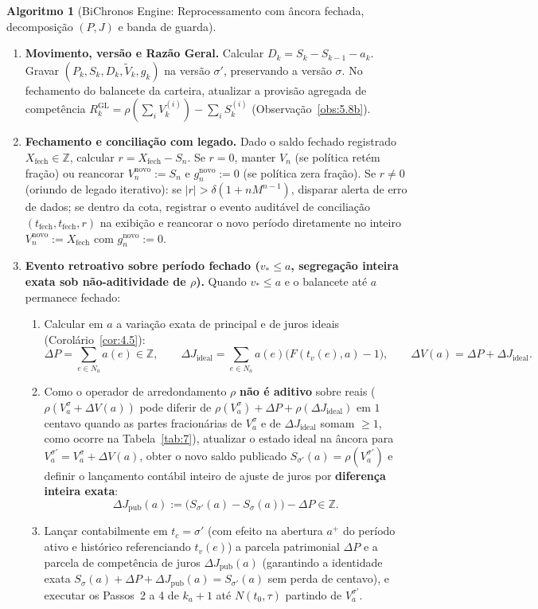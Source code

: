 \documentclass[11pt, a4paper]{article}
\theoremstyle{definition}
\newtheorem{algoritmo}[definicao]{Algoritmo}
\theoremstyle{plain}
\theoremstyle{remark}
\begin{document}
\begin{algoritmo}[BiChronos Engine: Reprocessamento com âncora fechada, decomposição $(P, J)$ e banda de guarda]
\begin{enumerate}[label=\textbf{\arabic*.}]
    \item \textbf{Movimento, versão e Razão Geral.} Calcular $D_k = S_k - S_{k-1} - a_k$. Gravar $(P_k, S_k, D_k, \tilde{V}_k, g_k)$ na versão $\sigma'$, preservando a versão $\sigma$. No fechamento do balancete da carteira, atualizar a provisão agregada de competência $R_k^{\text{GL}} = \rho(\sum_i V_k^{(i)}) - \sum_i S_k^{(i)}$ (Observação~\ref{obs:5.8b}).
    \item \textbf{Fechamento e conciliação com legado.} Dado o saldo fechado registrado $X_{\text{fech}} \in \mathbb{Z}$, calcular $r = X_{\text{fech}} - S_n$. Se $r = 0$, manter $V_n$ (se política retém fração) ou reancorar $V_n^{\text{novo}} := S_n$ e $g_n^{\text{novo}} := 0$ (se política zera fração). Se $r \neq 0$ (oriundo de legado iterativo): se $|r| > \delta(1 + n M^{n-1})$, disparar alerta de erro de dados; se dentro da cota, registrar o evento auditável de conciliação $(t_{\text{fech}}, t_{\text{fech}}, r)$ na exibição e reancorar o novo período diretamente no inteiro $V_n^{\text{novo}} := X_{\text{fech}}$ com $g_n^{\text{novo}} := 0$.
    \item \textbf{Evento retroativo sobre período fechado ($v_* \le a$, segregação inteira exata sob não-aditividade de $\rho$).} Quando $v_* \le a$ e o balancete até $a$ permanece fechado:
    \begin{enumerate}[label=(\alph*)]
        \item Calcular em $a$ a variação exata de principal e de juros ideais (Corolário~\ref{cor:4.5}):
        \[
        \Delta P = \sum_{e \in N_a} a(e) \in \mathbb{Z}, \qquad \Delta J_{\text{ideal}} = \sum_{e \in N_a} a(e)\big(F(t_v(e), a) - 1\big), \qquad \Delta V(a) = \Delta P + \Delta J_{\text{ideal}}.
        \]
        \item Como o operador de arredondamento $\rho$ \textbf{não é aditivo} sobre reais ($\rho(V_a^\sigma + \Delta V(a))$ pode diferir de $\rho(V_a^\sigma) + \Delta P + \rho(\Delta J_{\text{ideal}})$ em $1$ centavo quando as partes fracionárias de $V_a^\sigma$ e de $\Delta J_{\text{ideal}}$ somam $\ge 1$, como ocorre na Tabela~\ref{tab:7}), atualizar o estado ideal na âncora para $V_a^{\sigma'} = V_a^\sigma + \Delta V(a)$, obter o novo saldo publicado $S_{\sigma'}(a) = \rho(V_a^{\sigma'})$ e definir o lançamento contábil inteiro de ajuste de juros por \textbf{diferença inteira exata}:
        \[
        \Delta J_{\text{pub}}(a) := \big(S_{\sigma'}(a) - S_\sigma(a)\big) - \Delta P \in \mathbb{Z}.
        \]
        \item Lançar contabilmente em $t_c = \sigma'$ (com efeito na abertura $a^+$ do período ativo e histórico referenciando $t_v(e)$) a parcela patrimonial $\Delta P$ e a parcela de competência de juros $\Delta J_{\text{pub}}(a)$ (garantindo a identidade exata $S_\sigma(a) + \Delta P + \Delta J_{\text{pub}}(a) = S_{\sigma'}(a)$ sem perda de centavo), e executar os Passos~2 a 4 de $k_a + 1$ até $N(t_0, \tau)$ partindo de $V_a^{\sigma'}$.
    \end{enumerate}
\end{enumerate}
\end{algoritmo}
\end{document}
